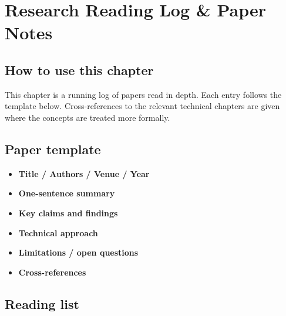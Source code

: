 
\section{Research Reading Log \& Paper Notes}

\subsection{How to use this chapter}

This chapter is a running log of papers read in depth. Each entry follows the template
below. Cross-references to the relevant technical chapters are given where the concepts
are treated more formally.

\subsection{Paper template}

\begin{itemize}
  \item \textbf{Title / Authors / Venue / Year}
  \item \textbf{One-sentence summary}
  \item \textbf{Key claims and findings}
  \item \textbf{Technical approach}
  \item \textbf{Limitations / open questions}
  \item \textbf{Cross-references}
\end{itemize}

\subsection{Reading list}


